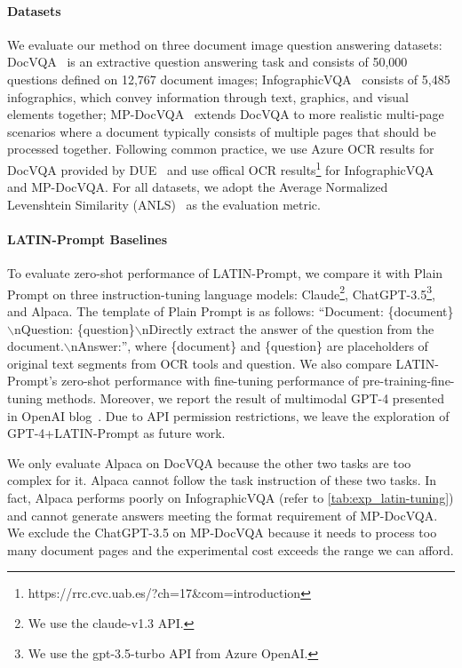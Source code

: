 \documentclass[letterpaper]{article} \usepackage{aaai24_preprint}  \usepackage{times}  \usepackage{helvet}  \usepackage{courier}  \usepackage[hyphens]{url}  \usepackage{graphicx} \urlstyle{rm} \def\UrlFont{\rm}  \usepackage{natbib}  \usepackage{caption} \frenchspacing  \setlength{\pdfpagewidth}{8.5in} \setlength{\pdfpageheight}{11in} \usepackage{algorithm}
\begin{document}
\paragraph{Datasets}
We evaluate our method on three document image question answering datasets:
DocVQA~\cite{mathewDocVQA2021} is an extractive question answering task and consists of 50,000 questions defined on 12,767 document images;
InfographicVQA~\cite{mathewInfographicVQA2021} consists of 5,485 infographics, which convey information through text, graphics, and visual elements together;
MP-DocVQA~\cite{titoMulti-PageDocVQAHi-VT52023} extends DocVQA to more realistic multi-page scenarios where a document typically consists of multiple pages that should be processed together.
Following common practice, we use Azure OCR results for DocVQA provided by DUE~\cite{borchmannDUEEndtoEndDocument2021} and use offical OCR results\footnote{https://rrc.cvc.uab.es/?ch=17\&com=introduction} for InfographicVQA and MP-DocVQA.
For all datasets, we adopt the Average Normalized Levenshtein Similarity (ANLS)~\cite{bitenST-VQA2019} as the evaluation metric.

\paragraph{LATIN-Prompt Baselines}
To evaluate zero-shot performance of LATIN-Prompt, we compare it with Plain Prompt on three instruction-tuning language models: Claude\footnote{We use the claude-v1.3 API.}, ChatGPT-3.5\footnote{We use the gpt-3.5-turbo API from Azure OpenAI.}, and Alpaca.
The template of Plain Prompt is as follows: ``Document: \{document\}$\backslash$nQuestion: \{question\}$\backslash$nDirectly extract the answer of the question from the document.$\backslash$nAnswer:'', where \{document\} and \{question\} are placeholders of original text segments from OCR tools and question.
We also compare LATIN-Prompt's zero-shot performance with fine-tuning performance of pre-training-fine-tuning methods.
Moreover, we report the result of multimodal GPT-4 presented in OpenAI blog~\cite{OpenAIGPT4Blog2023}.
Due to API permission restrictions, we leave the exploration of GPT-4+LATIN-Prompt as future work.

We only evaluate Alpaca on DocVQA because the other two tasks are too complex for it.
Alpaca cannot follow the task instruction of these two tasks.
In fact, Alpaca performs poorly on InfographicVQA (refer to \cref{tab:exp_latin-tuning}) and cannot generate answers meeting the format requirement of MP-DocVQA.
We exclude the ChatGPT-3.5 on MP-DocVQA because it needs to process too many document pages and the experimental cost exceeds the range we can afford.
\end{document}
